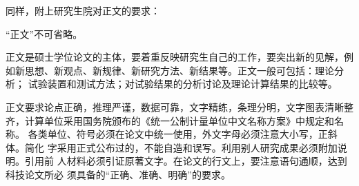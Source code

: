 同样，附上研究生院对正文的要求：

“正文”不可省略。

正文是硕士学位论文的主体，要着重反映研究生自己的工作，要突出新的见解，例
如新思想、新观点、新规律、新研究方法、新结果等。正文一般可包括：理论分析；
试验装置和测试方法；对试验结果的分析讨论及理论计算结果的比较等。

正文要求论点正确，推理严谨，数据可靠，文字精练，条理分明，文字图表清晰整
齐，计算单位采用国务院颁布的《统一公制计量单位中文名称方案》中规定和名称。
各类单位、符号必须在论文中统一使用，外文字母必须注意大小写，正斜体。简化
字采用正式公布过的，不能自造和误写。利用别人研究成果必须附加说明。引用前
人材料必须引证原著文字。在论文的行文上，要注意语句通顺，达到科技论文所必
须具备的“正确、准确、明确”的要求。

